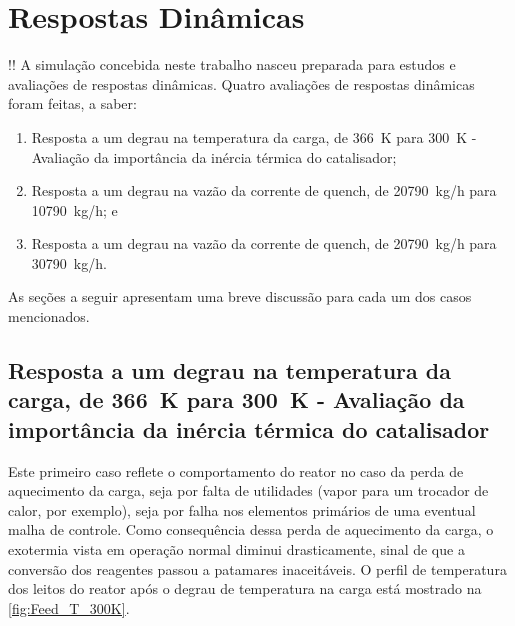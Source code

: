 \section{Respostas Dinâmicas} \label{sec:respostasdinamicas}
!!
A simulação concebida neste trabalho nasceu preparada para estudos e avaliações
de respostas dinâmicas. Quatro avaliações de respostas dinâmicas foram feitas, a
saber:

\begin{enumerate}
  \item Resposta a   um degrau na temperatura da carga, de \SI{366}{K} para
  \SI{300}{K} - Avaliação da importância da inércia térmica do catalisador;
  \item Resposta a um degrau na vazão da corrente de quench, de \SI{20790}{kg/h}
  para \SI{10790}{kg/h}; e
  \item Resposta a um degrau na vazão da corrente de quench, de \SI{20790}{kg/h}
  para \SI{30790}{kg/h}.
\end{enumerate}

As seções a seguir apresentam uma breve discussão para cada um dos casos
mencionados.

\subsection{Resposta a   um degrau na temperatura da carga, de \SI{366}{K} para
\SI{300}{K} - Avaliação da importância da inércia térmica do catalisador}
\label{sec:respostaaumdegrautemp}

Este primeiro caso reflete o comportamento do reator no caso da perda de
aquecimento da carga, seja por falta de utilidades (vapor para um trocador de
calor, por exemplo), seja por falha nos elementos primários de uma eventual
malha de controle. Como consequência dessa perda de aquecimento da carga, o
exotermia vista em operação normal diminui drasticamente, sinal de que a
conversão dos reagentes passou a patamares inaceitáveis. O perfil de temperatura
dos leitos do reator após o degrau de temperatura na carga está mostrado na
\autoref{fig:Feed_T_300K}.

